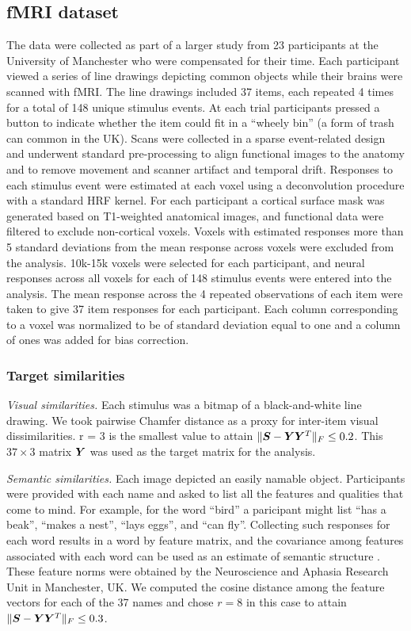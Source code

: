 \subsection{fMRI dataset} The data were collected as part of a larger study from 23
participants at the University of Manchester who were compensated for their time. Each
participant viewed a series of line drawings depicting common objects while their brains
were scanned with fMRI. The line drawings included 37 items, each repeated 4 times for a
total of 148 unique stimulus events. At each trial participants pressed a button to
indicate whether the item could fit in a ``wheely bin'' (a form of trash can common in the
UK).
Scans were collected in a sparse event-related design and underwent standard
pre-processing to align functional images to the anatomy and to remove movement and
scanner artifact and temporal drift. Responses to each stimulus event were estimated at
each voxel using a deconvolution procedure with a standard HRF kernel. For each
participant a cortical surface mask was generated based on T1-weighted anatomical images,
and functional data were filtered to exclude non-cortical voxels. Voxels with estimated
responses more than 5 standard deviations from the mean response across voxels were
excluded from the analysis. 10k-15k voxels were selected for each participant, and neural
responses across all voxels for each of 148 stimulus events were entered into the
analysis. The mean response across the 4 repeated observations of each item were taken to
give 37 item responses for each participant. Each column corresponding to a voxel was
normalized to be of standard deviation equal to one and a column of ones was added for
bias correction.

\subsubsection*{Target similarities}
\textit{Visual similarities.} Each stimulus was a bitmap of a black-and-white line
drawing. We took pairwise Chamfer distance as a proxy for inter-item visual
dissimilarities. r = 3 is the smallest value to attain $\|\boldsymbol{S} - \boldsymbol{Y}\boldsymbol{Y}^T\|_F \leq 0.2$.
This $37 \times 3$ matrix $\boldsymbol{Y}$ was used as the target matrix for the analysis.

\textit{Semantic similarities.} Each image depicted an easily namable object. Participants
were provided with each name and asked to list all the features and qualities that come to
mind. For example, for the word ``bird'' a paricipant might list ``has a beak'', ``makes a
nest'', ``lays eggs'', and ``can fly''. Collecting such responses for each word results in
a word by feature matrix, and the covariance among features associated with each word can
be used as an estimate of semantic structure \citep[\eg][]{mcrae2005semantic}. These feature norms were obtained by the Neuroscience and Aphasia Research Unit in
Manchester, UK. We computed the cosine distance among the feature vectors for each of the 37 names
and chose $r = 8$ in this case to attain $\|\boldsymbol{S} - \boldsymbol{Y}\boldsymbol{Y}^T\|_F \leq 0.3$.

